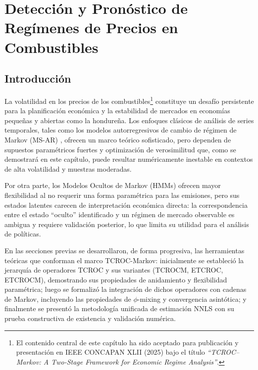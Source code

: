 \chapter{Detección y Pronóstico de Regímenes de Precios en Combustibles}
\label{cap:regimenes_combustibles}

\section{Introducción}
\label{sec:combustibles_intro}

La volatilidad en los precios de los combustibles\footnote{El contenido
central de este capítulo ha sido aceptado para publicación y presentación
en IEEE CONCAPAN XLII (2025) bajo el título \emph{``TCROC--Markov: A Two-Stage
Framework for Economic Regime Analysis''}.} constituye un desafío
persistente para la planificación económica y la estabilidad de
mercados en economías pequeñas y abiertas como la hondureña.  Los
enfoques clásicos de análisis de series temporales, tales como los modelos
autorregresivos de cambio de régimen de Markov (MS-AR)
\cite{Hamilton1994,KimNelson1999}, ofrecen un marco teórico
sofisticado, pero dependen de supuestos paramétricos fuertes y
optimización de verosimilitud que, como se demostrará en este
capítulo, puede resultar numéricamente inestable en contextos de alta
volatilidad y muestras moderadas.

Por otra parte, los Modelos Ocultos de Markov (HMMs) ofrecen mayor flexibilidad 
al no requerir una forma paramétrica para las emisiones, pero sus estados latentes 
carecen de interpretación económica directa: la correspondencia entre el estado 
``oculto'' identificado y un régimen de mercado observable es ambigua y requiere 
validación posterior, lo que limita su utilidad para el análisis de políticas.

En las secciones previas se desarrollaron, de forma progresiva, las
herramientas teóricas que conforman el marco TCROC-Markov:
inicialmente se estableció la jerarquía
de operadores TCROC y sus variantes (TCROCM, ETCROC, ETCROCM),
demostrando sus propiedades de anidamiento y flexibilidad paramétrica;
luego se formalizó la integración de
dichos operadores con cadenas de Markov, incluyendo las propiedades
de $\phi$-mixing y convergencia asintótica; y finalmente
se presentó la metodología
unificada de estimación NNLS con su prueba constructiva de existencia
y validación numérica.

